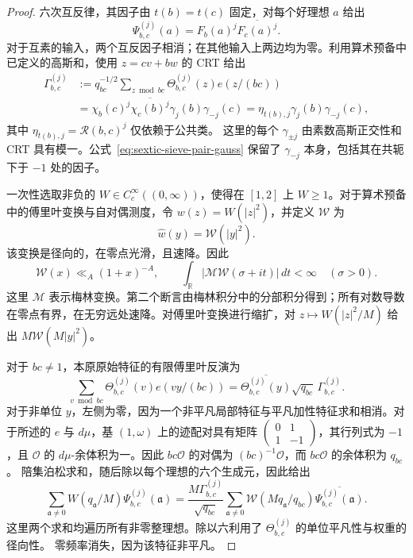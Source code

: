 \documentclass[11pt,a4paper]{article}
\numberwithin{equation}{section}
\numberwithin{figure}{section}
\theoremstyle{definition}
\theoremstyle{remark}
\begin{document}
\begin{proof}
六次互反律，其因子由 $t(b)=t(c)$ 固定，对每个好理想 $a$ 给出
\begin{equation}\label{eq:sextic-sieve-pair-values}
 \Psi_{b,c}^{(j)}(a)=F_b(a)^j\overline{F_c(a)^j}.
\end{equation}
对于互素的输入，两个互反因子相消；在其他输入上两边均为零。利用算术预备中已定义的高斯和，使用 $z=cv+bw$ 的 CRT 给出
\begin{equation}\label{eq:sextic-sieve-pair-gauss}
 \begin{split}
 \Gamma_{b,c}^{(j)}
 &:=q_{bc}^{-1/2}\sum_{z\bmod bc}\Theta_{b,c}^{(j)}(z)e(z/(bc))\\
 &=\chi_b(c)^j\overline{\chi_c(b)^j}\gamma_j(b)\gamma_{-j}(c)
  =\eta_{t(b),j}\gamma_j(b)\gamma_{-j}(c),
 \end{split}
\end{equation}
其中 $\eta_{t(b),j}=\mathcal R(b,c)^j$ 仅依赖于公共类。
这里的每个 $\gamma_{\pm j}$ 由素数高斯正交性和 CRT 具有模一。公式~\eqref{eq:sextic-sieve-pair-gauss} 保留了
$\gamma_{-j}$ 本身，包括其在共轭下于 $-1$ 处的因子。

一次性选取非负的 $W\in C_c^\infty((0,\infty))$，使得在
$[1,2]$ 上 $W\ge1$。对于算术预备中的傅里叶变换与自对偶测度，令 $w(z)=W(|z|^2)$，并定义 $\mathscr W$ 为
\[
 \widehat w(y)=\mathscr W(|y|^2).
\]
该变换是径向的，在零点光滑，且速降。因此
\begin{equation}\label{eq:sextic-sieve-transform-bounds}
 \mathscr W(x)\ll_A(1+x)^{-A},\qquad
 \int_{\mathbb R}|\mathcal M\mathscr W(\sigma+it)|\,dt<\infty
       \quad(\sigma>0).
\end{equation}
这里 $\mathcal M$ 表示梅林变换。第二个断言由梅林积分中的分部积分得到；所有对数导数在零点有界，在无穷远处速降。对傅里叶变换进行缩扩，对 $z\mapsto W(|z|^2/M)$ 给出
$M\mathscr W(M|y|^2)$。

对于 $bc\ne1$，本原原始特征的有限傅里叶反演为
\[
 \sum_{v\bmod bc}\Theta_{b,c}^{(j)}(v)e(vy/(bc))
 =\overline{\Theta_{b,c}^{(j)}(y)}\sqrt{q_{bc}}\,
       \Gamma_{b,c}^{(j)}.
\]
对于非单位 $y$，左侧为零，因为一个非平凡局部特征与平凡加性特征求和相消。对于所述的
$e$ 与 $d\mu$，基 $(1,\omega)$ 上的迹配对具有矩阵
$\left(\begin{smallmatrix}0&1\\1&-1\end{smallmatrix}\right)$，其行列式为
$-1$，且 $\mathcal O$ 的 $d\mu$-余体积为一。因此
$bc\mathcal O$ 的对偶为 $(bc)^{-1}\mathcal O$，而
$bc\mathcal O$ 的余体积为 $q_{bc}$。
陪集泊松求和，随后除以每个理想的六个生成元，因此给出
\begin{equation}\label{eq:sextic-sieve-pair-poisson}
 \sum_{\mathfrak a\ne0}W(q_{\mathfrak a}/M)\Psi_{b,c}^{(j)}(\mathfrak a)
 =\frac{M\Gamma_{b,c}^{(j)}}{\sqrt{q_{bc}}}
   \sum_{\mathfrak a\ne0}\mathscr W(Mq_{\mathfrak a}/q_{bc})
                 \overline{\Psi_{b,c}^{(j)}(\mathfrak a)}.
\end{equation}
这里两个求和均遍历所有非零整理想。除以六利用了
$\Theta_{b,c}^{(j)}$ 的单位平凡性与权重的径向性。
零频率消失，因为该特征非平凡。


\end{proof}
\end{document}
